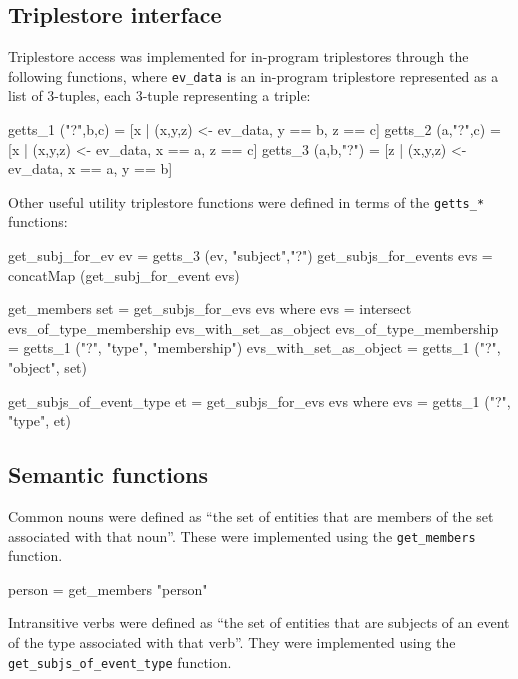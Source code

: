 \documentclass[../main.tex]{subfiles}
\begin{document}
\subsection{Triplestore interface}

Triplestore access was implemented for in-program triplestores through the following functions, where
\texttt{ev\_data} is an in-program triplestore represented as a list of 3-tuples, each 3-tuple representing a triple:

\begin{code}
  getts_1 ("?",b,c)   = [x | (x,y,z) <- ev_data, y == b, z == c]
  getts_2 (a,"?",c)   = [x | (x,y,z) <- ev_data, x == a, z == c]
  getts_3 (a,b,"?")   = [z | (x,y,z) <- ev_data, x == a, y == b]
\end{code}

Other useful utility triplestore functions were defined in terms of the \texttt{getts\_*}
functions:

\begin{code}
  get_subj_for_ev ev       = getts_3 (ev,  "subject","?")
  get_subjs_for_events evs = concatMap (get_subj_for_event evs)
	
  get_members set = get_subjs_for_evs evs
  where
    evs = intersect evs_of_type_membership evs_with_set_as_object
    evs_of_type_membership   = getts_1 ("?", "type", "membership")
    evs_with_set_as_object   = getts_1 ("?",  "object",  set)
		
  get_subjs_of_event_type et  = get_subjs_for_evs evs
  where
    evs = getts_1 ("?",  "type",  et)
\end{code}

\subsection{Semantic functions}

Common nouns were defined as ``the set of entities that are members of the set associated with that noun''\cite{frost2014denotational}.
These were implemented using the \texttt{get\_members} function.

\begin{code}
	person = get_members "person"
\end{code}

Intransitive verbs were defined as ``the set of entities that are subjects of an event of the type associated with that verb''\cite{frost2014denotational}.
They were implemented using the \texttt{get\_subjs\_of\_event\_type} function.
\end{document}
